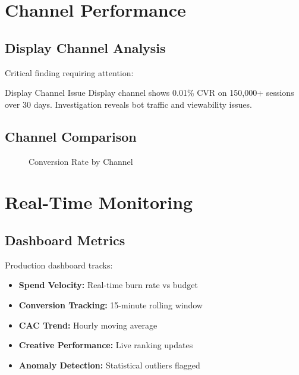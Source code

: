 \documentclass[11pt,a4paper]{report}
\begin{document}
\clearpage

\chapter{Channel Performance}

\section{Display Channel Analysis}

Critical finding requiring attention:

\begin{metricbox}{Display Channel Issue}
Display channel shows 0.01\% CVR on 150,000+ sessions over 30 days. Investigation reveals bot traffic and viewability issues.
\end{metricbox}

\section{Channel Comparison}

\begin{figure}[H]
\centering
{}
\caption{Conversion Rate by Channel}
\end{figure}

\clearpage

\chapter{Real-Time Monitoring}

\section{Dashboard Metrics}

Production dashboard tracks:

\begin{itemize}
\item \textbf{Spend Velocity:} Real-time burn rate vs budget
\item \textbf{Conversion Tracking:} 15-minute rolling window
\item \textbf{CAC Trend:} Hourly moving average
\item \textbf{Creative Performance:} Live ranking updates
\item \textbf{Anomaly Detection:} Statistical outliers flagged
\end{itemize}
\end{document}
